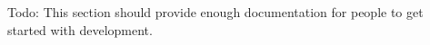 \-Todo\-: \-This section should provide enough documentation for people to get started with development. 